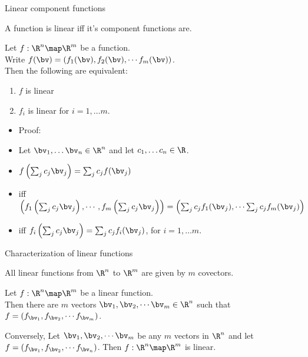 \documentclass{beamer}
\begin{document}
\begin{frame}{Linear component functions}

A function is linear iff it's component functions are.

\pause

\begin{lemma}
Let $f:\R^n\map\R^m$ be a function.\\
\pause
Write $f(\bv) = \left(f_1(\bv),f_2(\bv),\cdots f_m(\bv)\right)$. \\
\pause
Then the following are equivalent:
\pause
\begin{enumerate}
\item $f$ is linear
\item $f_i$ is linear for $i=1,\dots m$.
\end{enumerate}
\end{lemma}

\pause

\begin{itemize}
\item Proof:
\item Let $\bv_1,\dots\bv_n\in\R^n$ and let $c_1,\dots c_n \in\R$.
\item $f\left(\sum_j{c_j \bv_j}\right) = \sum_j{c_j f(\bv_j)}$
\item iff $\left(f_1\left(\sum_j{c_j \bv_j}\right),\cdots,f_m\left(\sum_j{c_j \bv_j}\right)\right) = \left( \sum_j{c_j f_1(\bv_j)},\cdots \sum_j{c_j f_m(\bv_j)} \right)$
\item iff $f_i\left(\sum_j{c_j \bv_j}\right) = \sum_j{c_j f_i(\bv_j)}$, for $i=1,\dots m$.
\end{itemize}

\end{frame}

\begin{frame}{Characterization of linear functions}

All linear functions from $\R^n$ to $\R^m$ are given by $m$ covectors.

\pause

\begin{theorem}
Let $f:\R^n\map\R^m$ be a linear function.\\
\pause
Then there are $m$ vectors $\bv_1,\bv_2,\cdots\bv_m \in \R^n$ such that
$f = \left(f_{\bv_1}, f_{\bv_2}, \cdots f_{\bv_m}\right)$.

\pause
\smallskip

Conversely, Let $\bv_1,\bv_2,\cdots\bv_m$ be any $m$ vectors in $\R^n$ and
let $f=\left(f_{\bv_1}, f_{\bv_2},\cdots f_{\bv_n}\right)$.
\pause
Then $f:\R^n\map\R^m$ is linear.

\end{theorem}

\end{frame}
\end{document}
